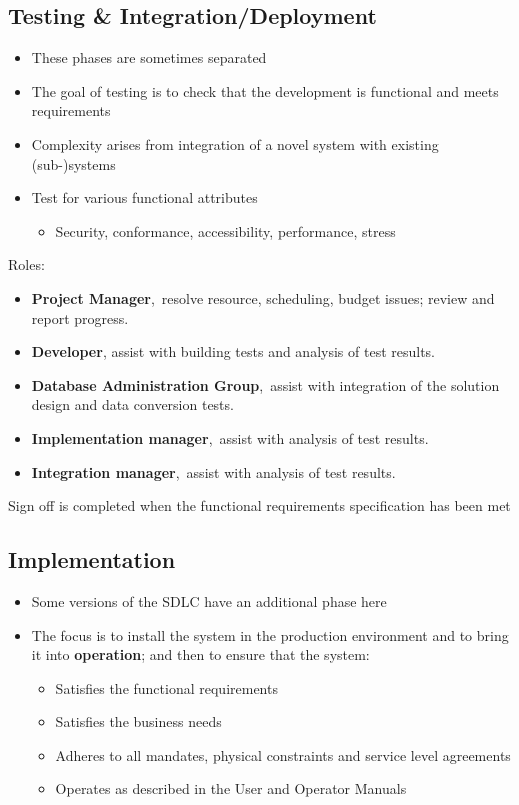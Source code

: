 \documentclass{article}[18pt]
\begin{document}
\subsection{Testing \& Integration/Deployment}
\begin{itemize}
	\item These phases are sometimes separated
	\item The goal of testing is to check that the development is functional and meets requirements
	\item Complexity arises from integration of a novel system with existing (sub-)systems
	\item Test for various functional attributes
	\begin{itemize}
		\item Security, conformance, accessibility, performance, stress
	\end{itemize}
\end{itemize}
Roles:
\begin{itemize}
	\item \textbf{Project Manager}, resolve resource, scheduling, budget issues; review and report progress.
	\item \textbf{Developer}, assist with building tests and analysis of test results.
	\item \textbf{Database Administration Group}, assist with integration of the solution design and data conversion tests.
	\item \textbf{Implementation manager}, assist with analysis of test results.
	\item \textbf{Integration manager}, assist with analysis of test results.
\end{itemize}
Sign off is completed when the functional requirements specification has been met
\subsection{Implementation}
\begin{itemize}
	\item Some versions of the SDLC have an additional phase here
	\item The focus is to install the system in the production environment and to bring it into \textbf{operation}; and then to ensure that the system:
	\begin{itemize}
		\item Satisfies the functional requirements
		\item Satisfies the business needs
		\item Adheres to all mandates, physical constraints and service level agreements
		\item Operates as described in the User and Operator Manuals
	\end{itemize}
\end{itemize}
\end{document}
